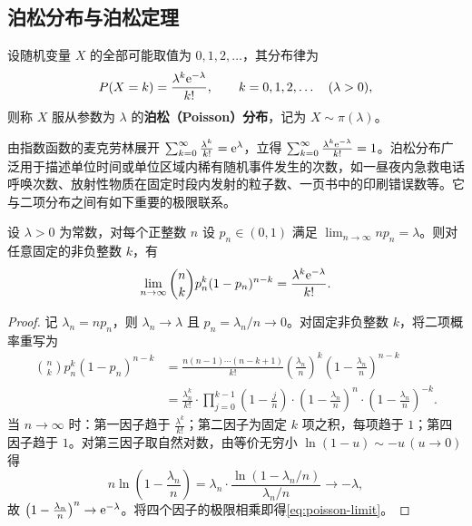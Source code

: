 \subsection{泊松分布与泊松定理}

\begin{definition}[泊松分布]
\label{def:poisson}
设随机变量 $X$ 的全部可能取值为 $0,1,2,\ldots$，其分布律为
\begin{equation}
  P(X=k)=\frac{\lambda^k\mathrm{e}^{-\lambda}}{k!},\qquad k=0,1,2,\ldots\quad(\lambda>0),
  \label{eq:poisson-law}
\end{equation}
则称 $X$ 服从参数为 $\lambda$ 的\textbf{泊松（Poisson）分布}，记为 $X\sim\pi(\lambda)$。
\end{definition}

由指数函数的麦克劳林展开 $\sum_{k=0}^{\infty}\frac{\lambda^k}{k!}=\mathrm{e}^\lambda$，立得 $\sum_{k=0}^{\infty}\frac{\lambda^k\mathrm{e}^{-\lambda}}{k!}=1$。泊松分布广泛用于描述单位时间或单位区域内稀有随机事件发生的次数，如一昼夜内急救电话呼唤次数、放射性物质在固定时段内发射的粒子数、一页书中的印刷错误数等。它与二项分布之间有如下重要的极限联系。

\begin{theorem}[泊松定理]
\label{thm:poisson-limit}
设 $\lambda>0$ 为常数，对每个正整数 $n$ 设 $p_n\in(0,1)$ 满足 $\lim_{n\to\infty}np_n=\lambda$。则对任意固定的非负整数 $k$，有
\begin{equation}
  \lim_{n\to\infty}\binom{n}{k}p_n^k(1-p_n)^{n-k}=\frac{\lambda^k\mathrm{e}^{-\lambda}}{k!}.
  \label{eq:poisson-limit}
\end{equation}
\end{theorem}
\begin{proof}
记 $\lambda_n=np_n$，则 $\lambda_n\to\lambda$ 且 $p_n=\lambda_n/n\to 0$。对固定非负整数 $k$，将二项概率重写为
\[
\begin{aligned}
  \binom{n}{k}p_n^k(1-p_n)^{n-k}
  &=\frac{n(n-1)\cdots(n-k+1)}{k!}\left(\frac{\lambda_n}{n}\right)^k\left(1-\frac{\lambda_n}{n}\right)^{n-k}\\
  &=\frac{\lambda_n^k}{k!}\cdot\prod_{j=0}^{k-1}\left(1-\frac{j}{n}\right)\cdot\left(1-\frac{\lambda_n}{n}\right)^{n}\cdot\left(1-\frac{\lambda_n}{n}\right)^{-k}.
\end{aligned}
\]
当 $n\to\infty$ 时：第一因子趋于 $\frac{\lambda^k}{k!}$；第二因子为固定 $k$ 项之积，每项趋于 $1$；第四因子趋于 $1$。对第三因子取自然对数，由等价无穷小 $\ln(1-u)\sim -u\,(u\to 0)$ 得
\[
  n\ln\left(1-\frac{\lambda_n}{n}\right)
  =\lambda_n\cdot\frac{\ln(1-\lambda_n/n)}{\lambda_n/n}
  \longrightarrow -\lambda,
\]
故 $\left(1-\frac{\lambda_n}{n}\right)^n\to\mathrm{e}^{-\lambda}$。将四个因子的极限相乘即得\eqref{eq:poisson-limit}。
\end{proof}

